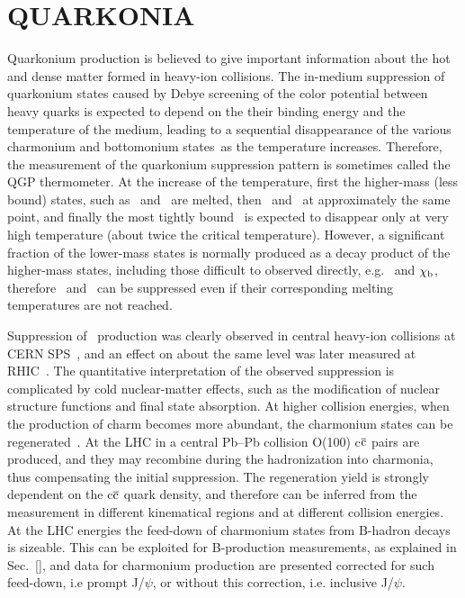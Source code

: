 \section{QUARKONIA}
\label{quarkonia}
Quarkonium production is believed to give important information about the
hot and dense matter formed in heavy-ion collisions.
The in-medium suppression  of quarkonium states caused by Debye screening of the color potential between heavy quarks
is expected to depend on the their binding energy and the temperature of the medium, leading to a sequential
disappearance of the various charmonium and
bottomonium states~as the temperature increases\cite{Matsui:1986dk,Digal:2001ue,Mocsy:2007jz}. Therefore, the measurement of the quarkonium suppression pattern is sometimes called the QGP thermometer. At the increase of the temperature, first the higher-mass (less bound) states, such as \psip\ and \PgUc\, are melted, then \Jpsi\ and \PgUb\ at approximately the same point, and finally the most tightly bound \PgUa\ is expected to disappear only at very high temperature (about twice the critical temperature). However, a significant fraction of the lower-mass states is normally produced as a decay product of the higher-mass states, including those difficult to observed directly, e.g. \chic\ and $\chi_{\rm b}$, therefore \Jpsi\ and \PgUa\ can be suppressed even if their corresponding melting temperatures are not reached.

Suppression of \Jpsi\ production was clearly observed in central heavy-ion collisions at CERN SPS~\cite{Baglin:1994ui,Alessandro:2004ap,Alessandro:2006ju,Arnaldi:2007zz}, and an effect on about the same level was later measured at RHIC~\cite{Adare:2006ns,Adare:2011yf}. The quantitative interpretation of the observed suppression is complicated by cold nuclear-matter effects, such as the modification of nuclear structure functions and final state absorption. At higher collision energies, when the production of charm becomes more abundant, the charmonium states can be regenerated~\cite{BraunMunzinger:2000px,Thews:2000rj,Andronic:2007bi,Zhao:2007hh,Capella:2007jv}. At the LHC in a central Pb--Pb collision {\cal O}(100) c$\overline{\rm c}$ pairs are produced, and they may recombine during the hadronization into charmonia, thus compensating the initial suppression. The regeneration yield is strongly dependent on  the c$\overline{\rm c}$ quark density, and therefore can be inferred from the measurement in different kinematical regions and at different collision energies. At the LHC energies the feed-down of charmonium states from B-hadron decays is sizeable. This can be exploited for B-production measurements, as explained in Sec.~\ref{}, and data for charmonium production are presented corrected for such feed-down, i.e prompt J/$\psi$, or without this correction, i.e. inclusive J/$\psi$.


